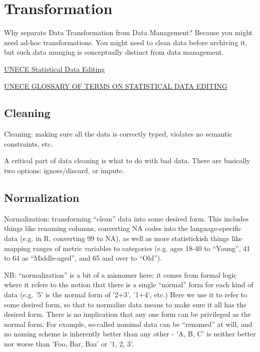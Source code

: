\part{Transformation}

\begin{ednote}
  Why separate Data Transformation from Data Management?  Because you
  might need ad-hoc transformations.  You might need to clean data
  before archiving it, but such data munging is conceptually distinct
  from data management.
\end{ednote}

\href{http://www.unece.org/stats/editing.html}{UNECE Statistical Data Editing}

\href{http://www.unece.org/fileadmin/DAM/stats/publications/editingglossary.pdf}{UNECE GLOSSARY OF TERMS ON STATISTICAL DATA EDITING}

\chapter{Cleaning}

Cleaning: making sure all the data is correctly typed, violates no semantic constraints, etc.

A critical part of data cleaning is what to do with bad data.  There
are basically two options: ignore/discard, or impute.

\chapter{Normalization}

Normalization: transforming ``clean'' data into some desired form.
This includes things like renaming columns, converting NA codes into
the language-specific data (e.g. in R, converting 99 to NA), as well
as more statistickish things like mapping ranges of metric variables
to categories (e.g. ages 18-40 to ``Young'', 41 to 64 as
``Middle-aged'', and 65 and over to ``Old'').

NB: ``normalization'' is a bit of a misnomer here; it comes from
formal logic where it refers to the notion that there is a single
``normal'' form for each kind of data (e.g. '5' is the normal form of
'2+3', '1+4', etc.)  Here we use it to refer to some desired form, so
that to normalize data means to make sure it all has the desired form.
There is no implication that any one form can be privileged as the
normal form.  For example, so-called nominal data can be ``renamed''
at will, and no naming scheme is inherently better than any other -
'A, B, C' is neither better nor worse than 'Foo, Bar, Baz' or '1, 2,
3'.

